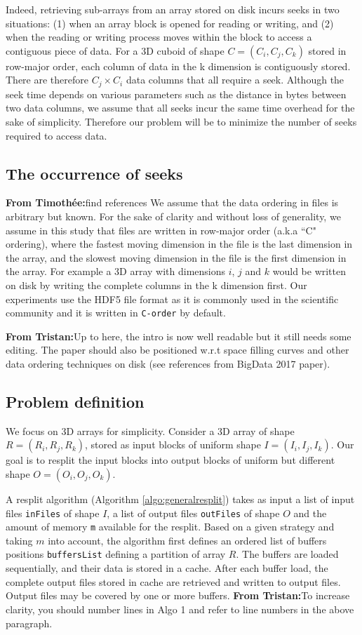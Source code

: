 \documentclass[conference]{IEEEtran}
\newcommand{\tristan}[1]{\color{orange}\textbf{From Tristan:}#1\color{black}}
\newcommand{\timothee}[1]{\color{blue}\textbf{From Timothée:}#1\color{black}}
\begin{document}
Indeed, retrieving sub-arrays from an array stored on disk incurs seeks in two situations: (1) when an array block
is opened for reading or writing, and (2) when the reading or writing process
moves within the block to access a contiguous piece of data. For a 3D cuboid of shape $C = (C_i, C_j, C_k)$
 stored in row-major order,
each column of data in the k dimension is contiguously stored. There are therefore
$C_j \times C_i$ data columns that all require a seek. Although the seek
time depends on various parameters such as the distance in bytes between two
data columns, we assume that all seeks incur the same time overhead for the sake
of simplicity. Therefore our problem will be to minimize the number of seeks
required to access data.

\subsection{The occurrence of seeks}
\timothee{find references}
We assume that the data ordering in files is arbitrary but known.
For the sake of clarity and without loss of generality,
 we assume in this study that files are written in row-major order (a.k.a
``C" ordering), where the fastest moving dimension in the file is the last
dimension in the array, and the slowest moving dimension in the file is the first
dimension in the array. For example a 3D array with dimensions $i$, $j$ and $k$
would be written on disk by writing the complete columns in the k dimension first.
Our experiments use the HDF5 file format as it is commonly used in the
scientific community and it is written in \texttt{C-order} by default.

\tristan{Up to here, the intro is now well readable but it still needs some
editing. The paper should also be positioned w.r.t space filling curves and other
data ordering techniques on disk (see references from BigData 2017 paper).}

\subsection{Problem definition}
We focus on 3D arrays for simplicity. Consider a 3D array of shape $R =
(R_i, R_j, R_k)$, stored as input blocks of uniform shape $I =
(I_i, I_j, I_k)$. Our goal is to resplit the input blocks into output
blocks of uniform but different shape $O = (O_i, O_j, O_k)$.

A resplit algorithm (Algorithm \ref{algo:generalresplit}) takes as input a
list of input files \texttt{inFiles} of shape $I$, a list of output files
\texttt{outFiles} of shape $O$ and the amount of memory \texttt{m}
available for the resplit. Based on a given strategy and taking $m$ into
account, the algorithm first defines an ordered list of buffers positions
\texttt{buffersList} defining a partition of array $R$. The buffers are
loaded sequentially, and their data is stored in a cache. After each buffer
load, the complete output files stored in cache are retrieved and written
to output files. Output files may be covered by one or more buffers. \tristan{To increase clarity,
you should number lines in Algo 1 and refer to line numbers in the above paragraph.}
\end{document}
